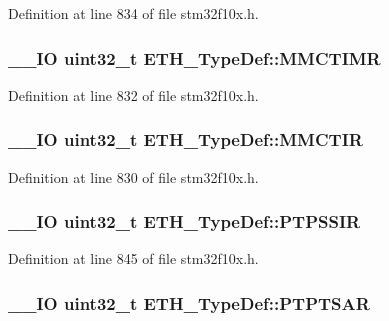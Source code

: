 Definition at line 834 of file stm32f10x.\-h.

\hypertarget{struct_e_t_h___type_def_acbe0f472d72f011c5903806d12c4e086}{
\subsubsection[{M\-M\-C\-T\-I\-M\-R}]{\setlength{\rightskip}{0pt plus 5cm}\-\_\-\-\_\-\-I\-O {\bf uint32\-\_\-t} E\-T\-H\-\_\-\-Type\-Def\-::\-M\-M\-C\-T\-I\-M\-R}}\label{struct_e_t_h___type_def_acbe0f472d72f011c5903806d12c4e086}


Definition at line 832 of file stm32f10x.\-h.

\hypertarget{struct_e_t_h___type_def_aa417b3dbd6f2bd86562b6a09f51d97ac}{
\subsubsection[{M\-M\-C\-T\-I\-R}]{\setlength{\rightskip}{0pt plus 5cm}\-\_\-\-\_\-\-I\-O {\bf uint32\-\_\-t} E\-T\-H\-\_\-\-Type\-Def\-::\-M\-M\-C\-T\-I\-R}}\label{struct_e_t_h___type_def_aa417b3dbd6f2bd86562b6a09f51d97ac}


Definition at line 830 of file stm32f10x.\-h.

\hypertarget{struct_e_t_h___type_def_ae4f81e69555bf3deef2f1404752861ad}{
\subsubsection[{P\-T\-P\-S\-S\-I\-R}]{\setlength{\rightskip}{0pt plus 5cm}\-\_\-\-\_\-\-I\-O {\bf uint32\-\_\-t} E\-T\-H\-\_\-\-Type\-Def\-::\-P\-T\-P\-S\-S\-I\-R}}\label{struct_e_t_h___type_def_ae4f81e69555bf3deef2f1404752861ad}


Definition at line 845 of file stm32f10x.\-h.

\hypertarget{struct_e_t_h___type_def_aa10f988327487d24260f0af1890273b2}{
\subsubsection[{P\-T\-P\-T\-S\-A\-R}]{\setlength{\rightskip}{0pt plus 5cm}\-\_\-\-\_\-\-I\-O {\bf uint32\-\_\-t} E\-T\-H\-\_\-\-Type\-Def\-::\-P\-T\-P\-T\-S\-A\-R}}\label{struct_e_t_h___type_def_aa10f988327487d24260f0af1890273b2}


